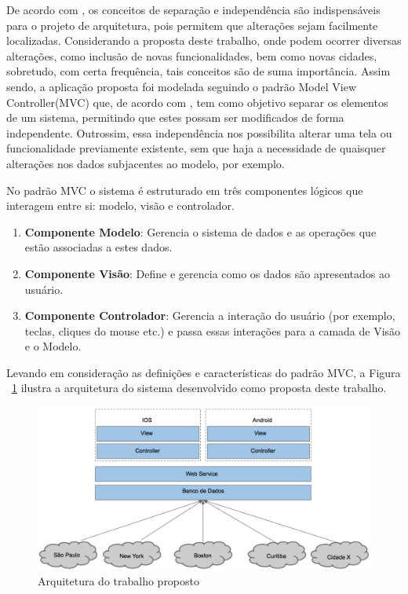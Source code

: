 De acordo com \cite{SOMMERVILLE2011}, os conceitos de separação e independência são indispensáveis para o projeto de arquitetura, pois permitem que alterações sejam facilmente localizadas. Considerando a proposta deste trabalho, onde podem ocorrer diversas alterações, como inclusão de novas funcionalidades, bem como novas cidades, sobretudo, com certa frequência, tais conceitos são de suma importância. Assim sendo, a aplicação proposta foi modelada seguindo o padrão Model View Controller(MVC) que,  de acordo com \cite{SOMMERVILLE2011}, tem como objetivo separar os elementos de um sistema, permitindo que estes possam ser modificados de forma independente. Outrossim, essa independência nos possibilita alterar uma tela ou funcionalidade previamente existente, sem que haja a necessidade de quaisquer alterações nos dados subjacentes ao modelo, por exemplo.

No padrão MVC o sistema é estruturado em três componentes lógicos que interagem entre si: modelo, visão e controlador.

\begin{enumerate}
\item \textbf{Componente Modelo}: Gerencia o sistema de dados e as operações que estão associadas a estes dados.
\item \textbf{Componente Visão}: Define e gerencia como os dados são apresentados ao usuário.
\item \textbf{Componente Controlador}: Gerencia a interação do usuário (por exemplo, teclas, cliques do mouse etc.) e passa essas interações para a camada de Visão e o Modelo.
\end{enumerate}

Levando em consideração as definições e características do padrão MVC, a Figura ~\ref{fig:arquitetura} ilustra a arquitetura do sistema desenvolvido como proposta deste trabalho.
 
\begin{figure}[htp]
\begin{center}
  \includegraphics[width=17cm]{images/arquitetura.png}
  \caption{Arquitetura do trabalho proposto}
  \label{fig:arquitetura}
\end{center}
\end{figure}

